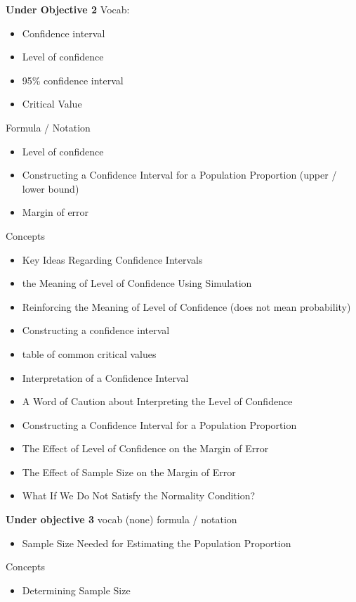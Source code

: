 \documentclass{report}
\begin{document}
        \bigbreak \noindent 
        \textbf{Under Objective 2}
        \bigbreak \noindent 
        Vocab:
        \begin{itemize}
          \item Confidence interval
          \item Level of confidence
          \item 95\% confidence interval
          \item Critical Value
        \end{itemize}
        \bigbreak \noindent 
        Formula / Notation
        \begin{itemize}
          \item Level of confidence 
         \item Constructing a Confidence Interval for a Population Proportion (upper / lower bound)
          \item Margin of error
        \end{itemize}
        \bigbreak \noindent 
        Concepts
        \begin{itemize}
          \item Key Ideas Regarding Confidence Intervals
          \item  the Meaning of Level of Confidence Using Simulation
          \item Reinforcing the Meaning of Level of Confidence (does not mean probability)
          \item Constructing a confidence interval
          \item table of common critical values
          \item Interpretation of a Confidence Interval
          \item A Word of Caution about Interpreting the Level of Confidence
          \item Constructing a Confidence Interval for a Population Proportion
          \item The Effect of Level of Confidence on the Margin of Error
          \item The Effect of Sample Size on the Margin of Error
          \item What If We Do Not Satisfy the Normality Condition?
        \end{itemize}

        \bigbreak \noindent 
        \textbf{Under objective 3}
        \bigbreak \noindent 
        vocab (none)
        \bigbreak \noindent 
        formula / notation
        \begin{itemize}
          \item Sample Size Needed for Estimating the Population Proportion
        \end{itemize}
        \bigbreak \noindent 
        Concepts
        \begin{itemize}
          \item Determining Sample Size
        \end{itemize}
\end{document}

